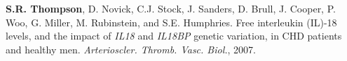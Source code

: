 \documentclass[10pt]{article}
\begin{document}
\begin{bibenum}
%
%
	\item {\bf S.R. Thompson}, D. Novick, C.J. Stock, J. Sanders, D. Brull, J. Cooper, P. Woo, G. Miller, M. Rubinstein, and S.E. Humphries.  Free interleukin (IL)-18 levels, and the impact of {\em IL18} and {\em IL18BP} genetic variation, in CHD patients and healthy men. {\em Arterioscler. Thromb. Vasc. Biol.}, 2007.\\ 
%
%
%
%

\end{bibenum}
\end{document}
